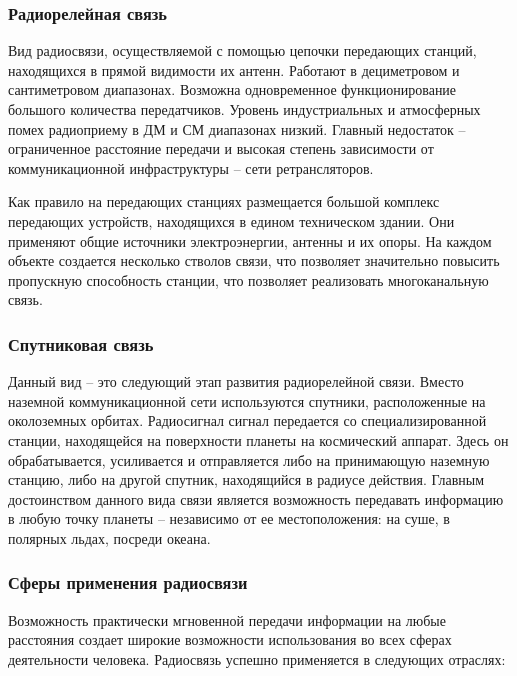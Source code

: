 \documentclass[a4paper]{report}
\begin{document}
\subsubsection{Радиорелейная связь}

Вид радиосвязи, осуществляемой с помощью цепочки передающих станций, находящихся в прямой видимости их антенн. Работают в дециметровом и сантиметровом диапазонах. Возможна одновременное функционирование большого количества передатчиков. Уровень индустриальных и атмосферных помех радиоприему в ДМ и СМ диапазонах низкий. Главный недостаток – ограниченное расстояние передачи и высокая степень зависимости от коммуникационной инфраструктуры – сети ретрансляторов.

Как правило на передающих станциях размещается большой комплекс передающих устройств, находящихся в едином техническом здании. Они применяют общие источники электроэнергии, антенны и их опоры. На каждом объекте создается несколько стволов связи, что позволяет значительно повысить пропускную способность станции, что позволяет реализовать многоканальную связь.

\subsubsection{Спутниковая связь}

Данный вид – это следующий этап развития радиорелейной связи. Вместо наземной коммуникационной сети используются спутники, расположенные на околоземных орбитах. Радиосигнал сигнал передается со специализированной станции, находящейся на поверхности планеты на космический аппарат. Здесь он обрабатывается, усиливается и отправляется либо на принимающую наземную станцию, либо на другой спутник, находящийся в радиусе действия. Главным достоинством данного вида связи является возможность передавать информацию в любую точку планеты – независимо от ее местоположения: на суше, в полярных льдах, посреди океана.

\subsubsection{Сферы применения радиосвязи}

Возможность практически мгновенной передачи информации на любые расстояния создает широкие возможности использования во всех сферах деятельности человека. Радиосвязь успешно применяется в следующих отраслях:
\end{document}
